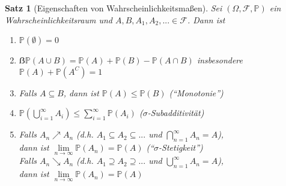 \documentclass[10pt,a4paper]{article}
\newcommand{\Prb}{\mathbb P}
\newcommand{\scF}{\ensuremath{\mathscr{F}}}
\theoremstyle{plain}
\newtheorem{satz}[theorem]{Satz}
\theoremstyle{definition}
\theoremstyle{remark}
\begin{document}
	\begin{satz}[Eigenschaften von Wahrscheinlichkeitsmaßen]\label{0122satz}
	Sei $(\Omega,\scF,\Prb)$ ein Wahrscheinlichkeitsraum und $A,B,A_1,A_2,...\in\scF$. Dann ist
	\begin{enumerate}[label=\alph*)]
		\item $\Prb(\emptyset)=0$
		\item $ẞ\Prb(A\cup B)=\Prb(A)+\Prb(B)-\Prb(A\cap B)$
		\subitem insbesondere $\Prb(A)+\Prb(A^C)=1$
		\item Falls $A\subseteq B$, dann ist $\Prb(A)\le\Prb(B)$ (\enquote{Monotonie})
		\item $\Prb\left(\bigcup_{i=1}^\infty A_i\right)\leq \sum_{i=1}^\infty \Prb(A_i)$ ($\sigma$-Subadditivität)
		\item Falls $A_n \nearrow A_n$ (d.h. $A_1\subseteq A_2\subseteq...$ und $\bigcap_{n=1}^\infty A_n=A$), \\
		dann ist $\lim\limits_{n\to\infty}\Prb(A_n)=\Prb(A)$ (\enquote{$\sigma$-Stetigkeit})\\
		Falls $A_n \searrow A_n$ (d.h. $A_1\supseteq A_2\supseteq...$ und $\bigcup_{n=1}^\infty A_n=A$), \\
		dann ist $\lim\limits_{n\to\infty}\Prb(A_n)=\Prb(A)$
	\end{enumerate}
	\end{satz}
\end{document}
